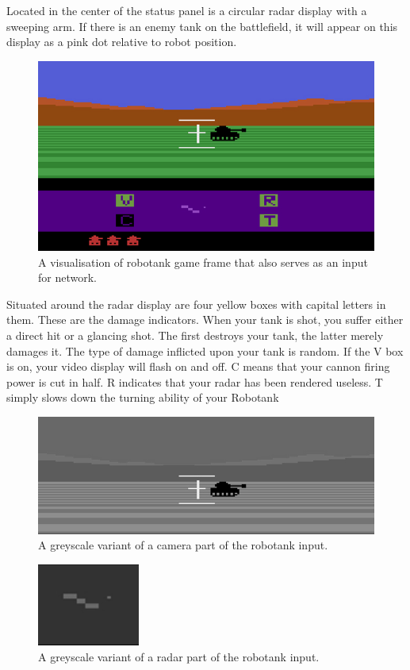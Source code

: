 Located in the center of the status panel is a circular radar display with a sweeping arm.
If there is an enemy tank on the battlefield, it will appear on this display as a pink dot 
relative to robot position.
\begin{figure}[htb] 
	\centering
	\includegraphics[width=\textwidth]{figures/robotank}
	\caption{A visualisation of robotank game frame that also serves as an input for network.}
	\label{fig:robotank}
\end{figure}

Situated around the radar display are four yellow boxes with capital letters in them.
These are the damage indicators. When your tank is shot, you suffer either a direct hit or a 
glancing shot. The first destroys your tank, the latter merely damages it.
The type of damage inflicted upon your tank is random.
If the V box is on, your video display will flash on and off. C means that your cannon 
firing power is cut in half. R indicates that your radar has been rendered useless.
T simply slows down the turning ability of your Robotank
\begin{figure}[htb] 
	\centering
	\includegraphics[width=\textwidth]{figures/robotank-cam}
	\caption{A greyscale variant of a camera part of the robotank input.}
	\label{fig:robotank-cam}
\end{figure}
\begin{figure}[htb] 
	\centering
	\includegraphics[width=0.3\textwidth]{figures/robotank-radar}
	\caption{A greyscale variant of a radar part of the robotank input.}
	\label{fig:robotank-radar}
\end{figure}

